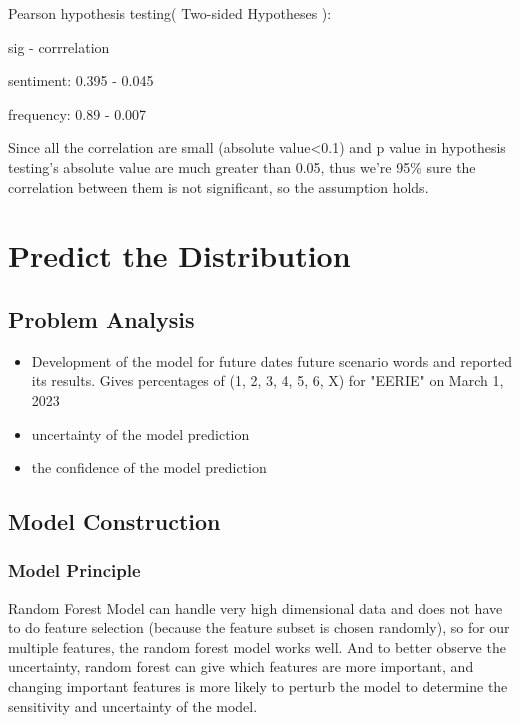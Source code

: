 \documentclass{mcmthesis}
\begin{document}
Pearson hypothesis testing( Two-sided Hypotheses ):  

\hspace*{3cm}sig - corrrelation

\hspace*{1.2cm}sentiment: 0.395 - 0.045 

\hspace*{1.2cm}frequency: 0.89 - 0.007

Since all the correlation are small (absolute value<0.1) and p value in hypothesis testing’s absolute value are much greater than 0.05, thus we’re 95\% sure the correlation between them is not significant, so the assumption holds.




\section{Predict the Distribution}
\subsection{Problem Analysis}

\begin{itemize}
\item Development of the model for future dates future scenario words and reported its results. Gives percentages of (1, 2, 3, 4, 5, 6, X) for "EERIE" on March 1, 2023
\item uncertainty of the model prediction 
\item the confidence of the model prediction 
\end{itemize}

\subsection{Model Construction}

\subsubsection{Model Principle}
\hspace*{0.6cm}Random Forest Model can handle very high dimensional data and does not have to do feature selection (because the feature subset is chosen randomly), so for our multiple features, the random forest model works well. And to better observe the uncertainty, random forest can give which features are more important, and changing important features is more likely to perturb the model to determine the sensitivity and uncertainty of the model.
\end{document}
